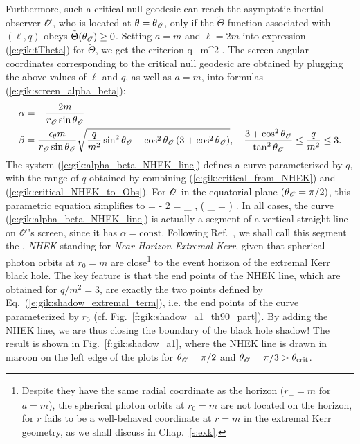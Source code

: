 Furthermore, such a critical null geodesic can reach the asymptotic inertial
observer $\mathscr{O}$, who is located at $\theta = \theta_{\mathscr{O}}$, only if the
$\tilde{\Theta}$ function associated with $(\ell,q)$ obeys $\tilde{\Theta}(\theta_{\mathscr{O}}) \geq 0$.
Setting $a=m$ and $\ell=2m$ into expression (\ref{e:gik:tTheta}) for $\tilde{\Theta}$,
we get the criterion
\be \label{e:gik:critical_NHEK_to_Obs}
    q \geq {} \, m^2 .
\ee
The screen angular coordinates corresponding to the critical null geodesic
are obtained by plugging the
above values of $\ell$ and $q$, as well as $a=m$, into formulas (\ref{e:gik:screen_alpha_beta}):
\begin{subequations}
\label{e:gik:alpha_beta_NHEK_line}
\begin{align}
& \alpha = - \frac{2 m}{r_{\mathscr{O}}\sin\theta_{\mathscr{O}}}  \\
&  \beta = \frac{\epsilon_\theta m}{r_{\mathscr{O}}\sin\theta_{\mathscr{O}}} \sqrt{ \frac{q}{m^2}\sin^2\theta_{\mathscr{O}}
 - \cos^2\theta_{\mathscr{O}} \left( 3 + \cos^2\theta_{\mathscr{O}} \right)  },
 \quad \frac{3 + \cos^2\theta_{\mathscr{O}}}{\tan^2\theta_{\mathscr{O}}}  \leq \frac{q}{m^2} \leq 3 .
\end{align}
\end{subequations}
The system (\ref{e:gik:alpha_beta_NHEK_line}) defines a curve parameterized by $q$,
with the range of $q$ obtained by combining (\ref{e:gik:critical_from_NHEK}) and (\ref{e:gik:critical_NHEK_to_Obs}).
For $\mathscr{O}$ in the equatorial plane $(\theta_{\mathscr{O}} = \pi/2)$, this parametric equation
simplifies to
\be
    \alpha = - 2 
    \qand
    \beta = \eps_\th {} ,
     \leq {}   \qquad\left( \th_{\Obs} =  \right) .
\ee
In all cases, the curve (\ref{e:gik:alpha_beta_NHEK_line})
is actually a segment of a vertical straight line on $\mathscr{O}$'s screen, since it
has $\alpha=\mathrm{const}$. Following Ref.~\cite{GrallLS18},
we shall call this segment the , \emph{NHEK} standing
for \emph{Near Horizon Extremal Kerr}, given that spherical photon orbits
at $r_0=m$ are close\footnote{Despite they have the same radial coordinate as the horizon ($r_+=m$ for $a=m$),
the spherical photon orbits at $r_0=m$ are not located
on the horizon, for $r$ fails to be a well-behaved coordinate at $r=m$ in
the extremal Kerr geometry, as we shall discuss in Chap.~\ref{s:exk}.}
to the event horizon of the extremal Kerr black hole.
The key feature is that the end points
of the NHEK line, which are obtained for $q/m^2 = 3$,
are exactly the two points defined by Eq.~(\ref{e:gik:shadow_extremal_term}),
i.e. the end points of the curve parameterized by $r_0$ (cf. Fig.~\ref{f:gik:shadow_a1_th90_part}).
By adding the NHEK line, we are thus
closing the boundary of the black hole shadow! The result is shown in Fig.~\ref{f:gik:shadow_a1},
where the NHEK line is drawn in maroon on the left edge of the plots
for $\theta_{\mathscr{O}} = \pi/2$ and $\theta_{\mathscr{O}} = \pi/3 > \theta_{\rm crit}$.

